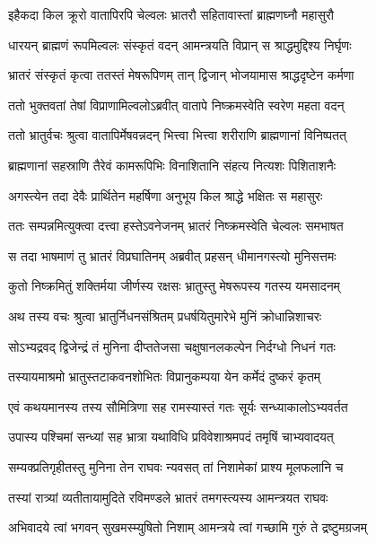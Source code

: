 \twolineshloka
{इहैकदा किल क्रूरो वातापिरपि चेल्वलः}
{भ्रातरौ सहितावास्तां ब्राह्मणघ्नौ महासुरौ} %

\twolineshloka
{धारयन् ब्राह्मणं रूपमिल्वलः संस्कृतं वदन्}
{आमन्त्रयति विप्रान् स श्राद्धमुद्दिश्य निर्घृणः} %

\twolineshloka
{भ्रातरं संस्कृतं कृत्वा ततस्तं मेषरूपिणम्}
{तान् द्विजान् भोजयामास श्राद्धदृष्टेन कर्मणा} %

\twolineshloka
{ततो भुक्तवतां तेषां विप्राणामिल्वलोऽब्रवीत्}
{वातापे निष्क्रमस्वेति स्वरेण महता वदन्} %

\twolineshloka
{ततो भ्रातुर्वचः श्रुत्वा वातापिर्मेषवन्नदन्}
{भित्त्वा भित्त्वा शरीराणि ब्राह्मणानां विनिष्पतत्} %

\twolineshloka
{ब्राह्मणानां सहस्राणि तैरेवं कामरूपिभिः}
{विनाशितानि संहत्य नित्यशः पिशिताशनैः} %

\twolineshloka
{अगस्त्येन तदा देवैः प्रार्थितेन महर्षिणा}
{अनुभूय किल श्राद्धे भक्षितः स महासुरः} %

\twolineshloka
{ततः सम्पन्नमित्युक्त्वा दत्त्वा हस्तेऽवनेजनम्}
{भ्रातरं निष्क्रमस्वेति चेल्वलः समभाषत} %

\twolineshloka
{स तदा भाषमाणं तु भ्रातरं विप्रघातिनम्}
{अब्रवीत् प्रहसन् धीमानगस्त्यो मुनिसत्तमः} %

\twolineshloka
{कुतो निष्क्रमितुं शक्तिर्मया जीर्णस्य रक्षसः}
{भ्रातुस्तु मेषरूपस्य गतस्य यमसादनम्} %

\twolineshloka
{अथ तस्य वचः श्रुत्वा भ्रातुर्निधनसंश्रितम्}
{प्रधर्षयितुमारेभे मुनिं क्रोधान्निशाचरः} %

\twolineshloka
{सोऽभ्यद्रवद् द्विजेन्द्रं तं मुनिना दीप्ततेजसा}
{चक्षुषानलकल्पेन निर्दग्धो निधनं गतः} %

\twolineshloka
{तस्यायमाश्रमो भ्रातुस्तटाकवनशोभितः}
{विप्रानुकम्पया येन कर्मेदं दुष्करं कृतम्} %

\twolineshloka
{एवं कथयमानस्य तस्य सौमित्रिणा सह}
{रामस्यास्तं गतः सूर्यः सन्ध्याकालोऽभ्यवर्तत} %

\twolineshloka
{उपास्य पश्चिमां सन्ध्यां सह भ्रात्रा यथाविधि}
{प्रविवेशाश्रमपदं तमृषिं चाभ्यवादयत्} %

\twolineshloka
{सम्यक्प्रतिगृहीतस्तु मुनिना तेन राघवः}
{न्यवसत् तां निशामेकां प्राश्य मूलफलानि च} %

\twolineshloka
{तस्यां रात्र्यां व्यतीतायामुदिते रविमण्डले}
{भ्रातरं तमगस्त्यस्य आमन्त्रयत राघवः} %

\twolineshloka
{अभिवादये त्वां भगवन् सुखमस्म्युषितो निशाम्}
{आमन्त्रये त्वां गच्छामि गुरुं ते द्रष्टुमग्रजम्} %

